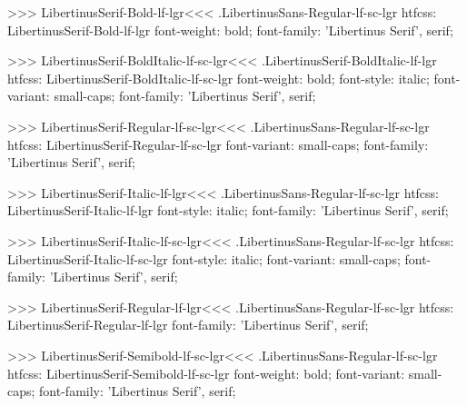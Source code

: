 >>>
\<LibertinusSerif-Bold-lf-lgr\><<<
.LibertinusSans-Regular-lf-sc-lgr
htfcss:  LibertinusSerif-Bold-lf-lgr  font-weight: bold; font-family: 'Libertinus Serif', serif;

>>>
\<LibertinusSerif-BoldItalic-lf-sc-lgr\><<<
.LibertinusSerif-BoldItalic-lf-lgr
htfcss:  LibertinusSerif-BoldItalic-lf-sc-lgr  font-weight: bold; font-style: italic; font-variant: small-caps; font-family: 'Libertinus Serif', serif;

>>>
\<LibertinusSerif-Regular-lf-sc-lgr\><<<
.LibertinusSans-Regular-lf-sc-lgr
htfcss:  LibertinusSerif-Regular-lf-sc-lgr  font-variant: small-caps; font-family: 'Libertinus Serif', serif;

>>>
\<LibertinusSerif-Italic-lf-lgr\><<<
.LibertinusSans-Regular-lf-sc-lgr
htfcss:  LibertinusSerif-Italic-lf-lgr  font-style: italic; font-family: 'Libertinus Serif', serif;

>>>
\<LibertinusSerif-Italic-lf-sc-lgr\><<<
.LibertinusSans-Regular-lf-sc-lgr
htfcss:  LibertinusSerif-Italic-lf-sc-lgr  font-style: italic; font-variant: small-caps; font-family: 'Libertinus Serif', serif;

>>>
\<LibertinusSerif-Regular-lf-lgr\><<<
.LibertinusSans-Regular-lf-sc-lgr
htfcss:  LibertinusSerif-Regular-lf-lgr  font-family: 'Libertinus Serif', serif;

>>>
\<LibertinusSerif-Semibold-lf-sc-lgr\><<<
.LibertinusSans-Regular-lf-sc-lgr
htfcss:  LibertinusSerif-Semibold-lf-sc-lgr  font-weight: bold; font-variant: small-caps; font-family: 'Libertinus Serif', serif;

